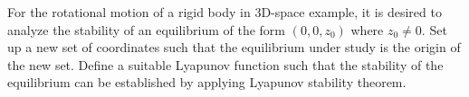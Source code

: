 \question[20]
%
For the rotational motion of a rigid body in $3$D-space example, it is desired
to analyze the stability of an equilibrium of the form $(0, 0, z_0)$ where $z_0
\neq 0$. Set up a new set of coordinates such that the equilibrium under study 
is the origin of the new set. Define a suitable Lyapunov function such that the 
stability of the equilibrium can be established by applying Lyapunov stability 
theorem.